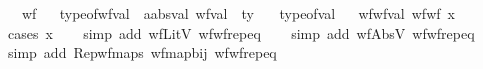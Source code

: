 \begin{isabellebody}
\ \ \ wf%
\isadelimproof
\ %
\endisadelimproof
%
\isatagproof
\isakeywordONE{{\isachardot}{\kern0pt}}\isamarkupfalse%
%
\endisatagproof
{\isafoldproof}%
%
\isadelimproof
%
\endisadelimproof
\isanewline
\isanewline
{}\isamarkupfalse%
\ type{\isacharunderscore}{\kern0pt}of{\isacharunderscore}{\kern0pt}wf{\isacharunderscore}{\kern0pt}val\ {\isacharcolon}{\kern0pt}{\isacharcolon}{\kern0pt}\ {\isachardoublequoteopen}{\isacharprime}{\kern0pt}a{\isacharcolon}{\kern0pt}{\isacharcolon}{\kern0pt}absval\ wf{\isacharunderscore}{\kern0pt}val\ {\isasymRightarrow}\ ty{\isachardoublequoteclose}\isanewline
\ \ \ type{\isacharunderscore}{\kern0pt}of{\isacharunderscore}{\kern0pt}val%
\isadelimproof
\ %
\endisadelimproof
%
\isatagproof
\isakeywordONE{{\isachardot}{\kern0pt}}\isamarkupfalse%
%
\endisatagproof
{\isafoldproof}%
%
\isadelimproof
%
\endisadelimproof
%
\isadelimdocument
%
\endisadelimdocument
%
\isatagdocument
%
\isamarkuptrue%
%
\endisatagdocument
{\isafolddocument}%
%
\isadelimdocument
%
\endisadelimdocument
{}\isamarkupfalse%
\ wf{\isacharunderscore}{\kern0pt}wf{\isacharunderscore}{\kern0pt}val{\isacharcolon}{\kern0pt}\ {\isachardoublequoteopen}wf{\isacharunderscore}{\kern0pt}wf\ x{\isachardoublequoteclose}\isanewline
%
\isadelimproof
\ \ %
\endisadelimproof
%
\isatagproof
{}\isamarkupfalse%
\ {\isacharparenleft}{\kern0pt}cases\ x{\isacharparenright}{\kern0pt}\isanewline
\ \ \isamarkupfalse%
\ {\isacharparenleft}{\kern0pt}simp\ add{\isacharcolon}{\kern0pt}\ wfLitV\ wf{\isacharunderscore}{\kern0pt}wf{\isachardot}{\kern0pt}rep{\isacharunderscore}{\kern0pt}eq{\isacharparenright}{\kern0pt}\isanewline
\ \ \isamarkupfalse%
\ {\isacharparenleft}{\kern0pt}simp\ add{\isacharcolon}{\kern0pt}\ wfAbsV\ wf{\isacharunderscore}{\kern0pt}wf{\isachardot}{\kern0pt}rep{\isacharunderscore}{\kern0pt}eq{\isacharparenright}{\kern0pt}\isanewline
\ \ \isamarkupfalse%
\ {\isacharparenleft}{\kern0pt}simp\ add{\isacharcolon}{\kern0pt}\ Rep{\isacharunderscore}{\kern0pt}wf{\isacharunderscore}{\kern0pt}maps\ wf{\isacharunderscore}{\kern0pt}map{\isacharunderscore}{\kern0pt}bij\ wf{\isacharunderscore}{\kern0pt}wf{\isachardot}{\kern0pt}rep{\isacharunderscore}{\kern0pt}eq{\isacharparenright}{\kern0pt}%
\endisatagproof
{\isafoldproof}%
%
\isadelimproof
\isanewline
%
\endisadelimproof
\isanewline
\isanewline
\isanewline
\isanewline
\isanewline

\end{isabellebody}
